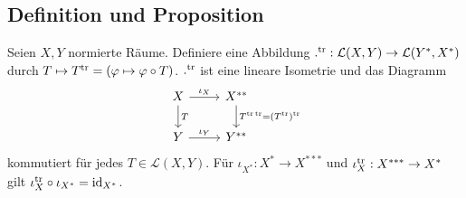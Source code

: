 \subsection[Definition und Proposition: Die transponierte Abbildung]{Definition und Proposition} %
\label{sub:34}
Seien $X,Y$ normierte Räume. Definiere eine Abbildung $.^{\mathrm{tr}} : \mathcal{L}(X,Y) \to \mathcal{L}(Y^*,X^*)$ durch $T \mapsto T^{\mathrm{tr}} = (\varphi \mapsto \varphi \circ T)$.
$.^{\mathrm{tr}}$ ist eine lineare Isometrie und das Diagramm
\[
	\begin{tikzcd}
		X \rar["\iota_X"] \dar["T"]& X^{**} \dar["T^{\tr \, \tr}= (T^\tr)^\tr"]\\
		Y \rar["\iota_Y"]& Y^{**}
	\end{tikzcd}
\]
kommutiert für jedes $T \in \mathcal{L}(X,Y)$. Für $\iota_{X^*} : X^* \to X^{***}$ und $\iota_{X}^{\mathrm{tr}} : X^{***} \to X^*$ gilt $\iota_X^{\mathrm{tr}} \circ \iota_{X^*} = \operatorname{id}_{X^*}$.
